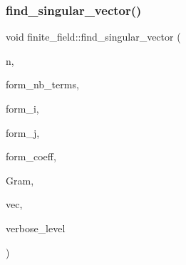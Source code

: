 \mbox{\label{classfinite__field_a71d9d2adde5b7dc94ccdd2b38baaca53}} 
\subsubsection{\texorpdfstring{find\+\_\+singular\+\_\+vector()}{find\_singular\_vector()}}
{\footnotesize\ttfamily void finite\+\_\+field\+::find\+\_\+singular\+\_\+vector (\begin{DoxyParamCaption}\item[{\mbox{\hyperlink{galois_8h_a09fddde158a3a20bd2dcadb609de11dc}{I\+NT}}}]{n,  }\item[{\mbox{\hyperlink{galois_8h_a09fddde158a3a20bd2dcadb609de11dc}{I\+NT}}}]{form\+\_\+nb\+\_\+terms,  }\item[{\mbox{\hyperlink{galois_8h_a09fddde158a3a20bd2dcadb609de11dc}{I\+NT}} $\ast$}]{form\+\_\+i,  }\item[{\mbox{\hyperlink{galois_8h_a09fddde158a3a20bd2dcadb609de11dc}{I\+NT}} $\ast$}]{form\+\_\+j,  }\item[{\mbox{\hyperlink{galois_8h_a09fddde158a3a20bd2dcadb609de11dc}{I\+NT}} $\ast$}]{form\+\_\+coeff,  }\item[{\mbox{\hyperlink{galois_8h_a09fddde158a3a20bd2dcadb609de11dc}{I\+NT}} $\ast$}]{Gram,  }\item[{\mbox{\hyperlink{galois_8h_a09fddde158a3a20bd2dcadb609de11dc}{I\+NT}} $\ast$}]{vec,  }\item[{\mbox{\hyperlink{galois_8h_a09fddde158a3a20bd2dcadb609de11dc}{I\+NT}}}]{verbose\+\_\+level }\end{DoxyParamCaption})}

\mbox{\label{classfinite__field_ae581b6b9280e56e629f56b7061ea976e}} 
